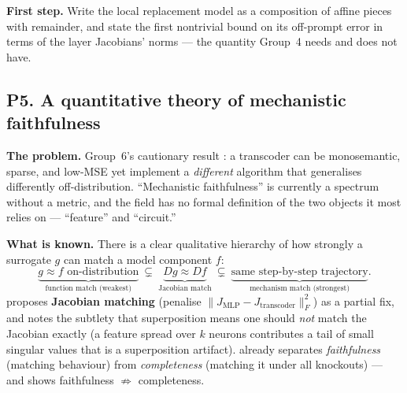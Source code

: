 \textbf{First step.} Write the local replacement model as a composition of affine pieces with
remainder, and state the first nontrivial bound on its off-prompt error in terms of the layer
Jacobians' norms --- the quantity Group~4 needs and does not have.

\subsection*{P5. A quantitative theory of mechanistic faithfulness}

\textbf{The problem.} Group~6's cautionary result \parencite{toy-model-of-mechanistic-unfaithfulness}:
a transcoder can be monosemantic, sparse, and low-MSE yet implement a \emph{different} algorithm
that generalises differently off-distribution. ``Mechanistic faithfulness'' is currently a
spectrum without a metric, and the field has no formal definition of the two objects it most
relies on --- ``feature'' and ``circuit.''

\textbf{What is known.} There is a clear qualitative hierarchy of how strongly a surrogate $g$ can
match a model component $f$:
\[
\underbrace{g\approx f \text{ on-distribution}}_{\text{function match (weakest)}}
\ \subsetneq\
\underbrace{Dg\approx Df}_{\text{Jacobian match}}
\ \subsetneq\
\underbrace{\text{same step-by-step trajectory}}_{\text{mechanism match (strongest)}}.
\]
\textcite{toy-model-of-mechanistic-unfaithfulness} proposes \textbf{Jacobian matching}
(penalise $\lVert J_{\mathrm{MLP}}-J_{\mathrm{transcoder}}\rVert_F^2$) as a partial fix, and notes
the subtlety that superposition means one should \emph{not} match the Jacobian exactly (a feature
spread over $k$ neurons contributes a tail of small singular values that is a superposition
artifact). \textcite{interpretability-in-the-wild-ioi} already separates \emph{faithfulness}
(matching behaviour) from \emph{completeness} (matching it under all knockouts) --- and shows
faithfulness $\not\Rightarrow$ completeness.

